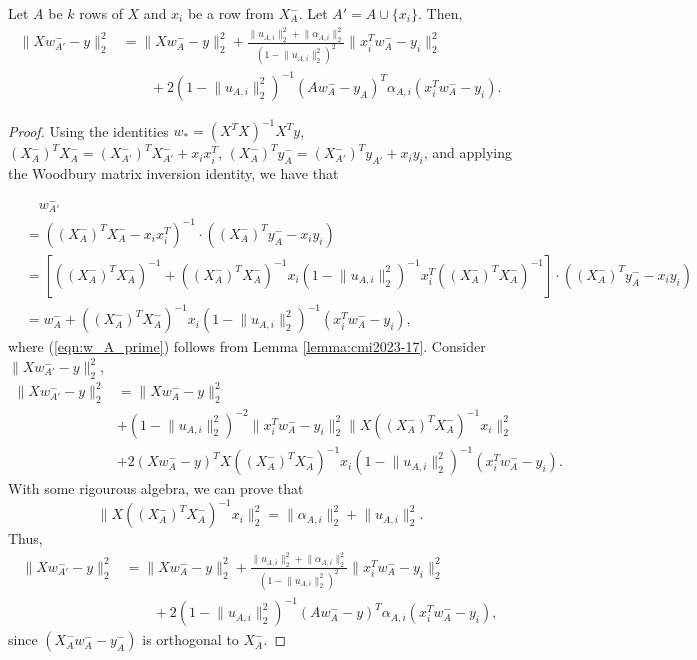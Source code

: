 \begin{lemma} \label{lemma:derived-error-A'}
    Let $A$ be $k$ rows of $X$ and $x_i$ be a row from $X_A^-$. Let $A' = A \cup \{x_i\}$. Then,
    \begin{align}
        \lVert Xw_{A'}^- - y\rVert^2_2 &= \lVert Xw_A^- - y \rVert^2_2 + \frac{\lVert u_{A, i} \rVert_2^2 + \lVert \alpha_{A,i} \rVert_2^2}{(1 - \lVert u_{A, i} \rVert_2^2)^2}\lVert x_i^T w_A^- - y_i \rVert_2^2 \nonumber\\
        & \qquad + 2 (1 - \lVert u_{A, i} \rVert_2^2)^{-1} (Aw_A^- - y_A)^T \alpha_{A, i} (x_i^T w_A^- - y_i).
    \end{align}
\end{lemma}
\begin{proof}
  Using the identities $w_* = (X^T X)^{-1} X^T y$, $(X_{A}^-)^T X_{A}^- = (X_{A'}^-)^T X_{A'}^- + x_i x_i^T$, $(X_{A}^-)^T y_A^- = (X_{A'}^-)^Ty_{A'} + x_i y_i$, and applying the Woodbury matrix inversion identity, we have that

  \begin{align}
    & \quad w_{A'}^- \nonumber \\
    &= \left( (X_{A}^-)^T X_{A}^- - x_ix_i^T \right)^{-1} \cdot \left( (X_{A}^-)^T y_{A}^-  - x_i y_i \right)\\
    &= \left[ \left((X_{A}^-)^T X_{A}^-\right)^{-1} + \left((X_{A}^-)^T X_{A}^-\right)^{-1} x_i\left(1 - \lVert u_{A, i} \rVert_2^2  \right)^{-1} x_i^T \left((X_{A}^-)^T X_{A}^-\right)^{-1}  \right] \cdot \left( (X_{A}^-)^T y_{A}^-  - x_i y_i \right)\\
    &= w_A^- + ((X_{A}^-)^T X_{A}^-)^{-1} x_i(1 - \lVert u_{A, i} \rVert_2^2)^{-1} (x_i^T w_A^- - y_i), \label{eqn:w_A_prime}
  \end{align}
  where (\ref{eqn:w_A_prime}) follows from Lemma \ref{lemma:cmi2023-17}. Consider $\lVert X w_{A'}^- - y \rVert_2^2$,
  \begin{align}
        \lVert Xw_{A'}^- - y \rVert^2_2 &= \lVert Xw_A^- - y \rVert_2^2 \nonumber \\
        & + (1 - \lVert u_{A, i} \rVert_2^2)^{-2}\lVert x_i^T w_A^- - y_i \rVert_2^2 \lVert X \left((X_{A}^-)^T X_{A}^- \right)^{-1} x_i \rVert_2^2 \nonumber\\
        & + 2(Xw_A^- - y)^T X \left((X_{A}^-)^T X_{A}^- \right)^{-1} x_i  (1 - \lVert u_{A, i} \rVert_2^2)^{-1}(x_i^T w_A^- - y_i).
    \end{align}
    With some rigourous algebra, we can prove that
    \begin{equation}
        \lVert X((X_{A}^-)^T X_{A}^-)^{-1} x_i \rVert_2^2 = \lVert \alpha_{A,i} \rVert^2_2 + \lVert u_{A, i} \rVert_2^2.
    \end{equation}
    Thus,
    \begin{align}
        \lVert Xw_{A'}^- - y \rVert^2_2 &= \lVert Xw_A^- - y \rVert_2^2 + \frac{\lVert u_{A, i} \rVert_2^2 + \lVert \alpha_{A,i} \rVert^2_2}{(1 - \lVert u_{A, i} \rVert_2^2)^{2}}\lVert x_i^T w_A^- - y_i \rVert_2^2 \nonumber \\
        & \qquad + 2  (1 - \lVert u_{A, i} \rVert_2^2)^{-1} (Aw_A^- - y)^T \alpha_{A, i} (x_i^T w_A^- - y_i),
    \end{align}
    since $(X_A^-w_A^- - y_A^-)$ is orthogonal to $X_A^-$. 


\end{proof}
